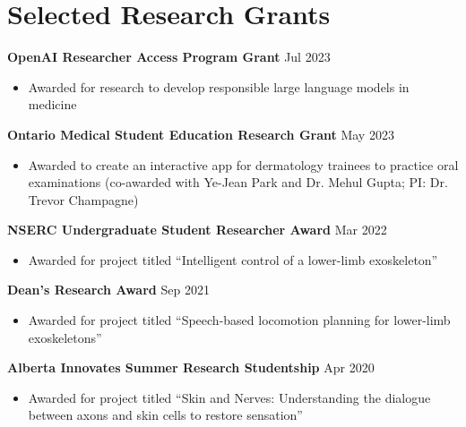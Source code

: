 \documentclass{article}
\begin{document}
\section*{\textcolor{my_colour}{Selected Research Grants} }
\vspace{-.25em} \hrulefill \vspace{.25em}

\textbf{OpenAI Researcher Access Program Grant} \hfill Jul 2023
\begin{itemize}
    \item Awarded for research to develop responsible large language models in medicine
\end{itemize} \vspace{1em}

\textbf{Ontario Medical Student Education Research Grant} \hfill May 2023
\begin{itemize}
    \item Awarded to create an interactive app for dermatology trainees to practice oral examinations (co-awarded with Ye-Jean Park and Dr. Mehul Gupta; PI: Dr. Trevor Champagne)
\end{itemize} \vspace{1em}

\textbf{NSERC Undergraduate Student Researcher Award} \hfill Mar 2022
\begin{itemize}
    \item Awarded for project titled ``Intelligent control of a lower-limb exoskeleton''
\end{itemize} \vspace{1em}

\textbf{Dean's Research Award} \hfill Sep 2021
\begin{itemize}
    \item Awarded for project titled ``Speech-based locomotion planning for lower-limb exoskeletons''
\end{itemize} \vspace{1em}

\textbf{Alberta Innovates Summer Research Studentship} \hfill Apr 2020
\begin{itemize}
    \item Awarded for project titled ``Skin and Nerves: Understanding the dialogue between axons and skin cells to restore sensation''
\end{itemize} \vspace{1em}
\end{document}
